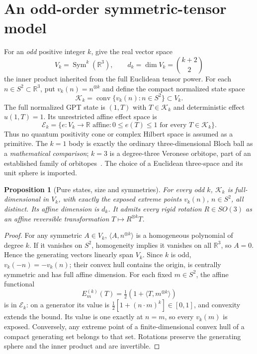 \documentclass[10.5pt,letterpaper]{article}
\newtheorem{proposition}[theorem]{Proposition}
\newcommand{\RR}{\mathbb{R}}
\newcommand{\KK}{\mathcal{K}}
\newcommand{\Sym}{\operatorname{Sym}}
\newcommand{\conv}{\operatorname{conv}}
\newcommand{\eff}{\mathcal{E}}
\begin{document}
\section{An odd-order symmetric-tensor model}
For an \emph{odd} positive integer $k$, give the real vector space
\[
V_k=\Sym^k(\RR^3),\qquad d_k=\dim V_k={k+2\choose2}
\]
the inner product inherited from the full Euclidean tensor power. For each $n\in S^2\subset\RR^3$, put $v_k(n)=n^{\otimes k}$ and define the compact normalized state space
\begin{equation}\label{eq:Kk}
\KK_k=\conv\{v_k(n):n\in S^2\}\subset V_k.
\end{equation}
The full normalized GPT state is $(1,T)$ with $T\in\KK_k$ and deterministic effect $u(1,T)=1$. Its unrestricted affine effect space is
\[
\eff_k=\{e:V_k\to\RR\text{ affine}:0\le e(T)\le1\text{ for every }T\in\KK_k\}.
\]
Thus no quantum positivity cone or complex Hilbert space is assumed as a primitive. The $k=1$ body is exactly the ordinary three-dimensional Bloch ball as a \emph{mathematical comparison}; $k=3$ is a degree-three Veronese orbitope, part of an established family of orbitopes~\cite{orbitopes}. The choice of a Euclidean three-space and its unit sphere is imported.

\begin{proposition}[Pure states, size and symmetries]\label{prop:geometry}
For every odd $k$, $\KK_k$ is full-dimensional in $V_k$, with exactly the exposed extreme points $v_k(n)$, $n\in S^2$, all distinct. Its affine dimension is $d_k$. It admits every rigid rotation $R\in SO(3)$ as an affine reversible transformation $T\mapsto R^{\otimes k}T$.
\end{proposition}
\begin{proof}
For any symmetric $A\in V_k$, $\langle A,n^{\otimes k}\rangle$ is a homogeneous polynomial of degree $k$. If it vanishes on $S^2$, homogeneity implies it vanishes on all $\RR^3$, so $A=0$. Hence the generating vectors linearly span $V_k$. Since $k$ is odd, $v_k(-n)=-v_k(n)$; their convex hull contains the origin, is centrally symmetric and has full affine dimension. For each fixed $m\in S^2$, the affine functional
\[
E_m^{(k)}(T)=\tfrac12(1+\langle T,m^{\otimes k}\rangle)
\]
is in $\eff_k$: on a generator its value is $\tfrac12[1+(n\cdot m)^k]\in[0,1]$, and convexity extends the bound. Its value is one exactly at $n=m$, so every $v_k(m)$ is exposed. Conversely, any extreme point of a finite-dimensional convex hull of a compact generating set belongs to that set. Rotations preserve the generating sphere and the inner product and are invertible.
\end{proof}
\end{document}

